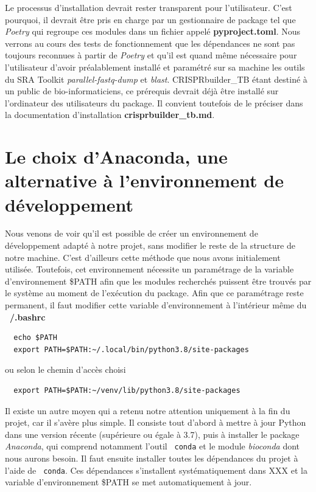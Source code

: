\documentclass[twoside,a4paper,11pt,frenchb,openany]{report}
\begin{document}
Le processus d'installation devrait rester transparent pour l'utilisateur. C'est pourquoi, il devrait être pris en charge par un gestionnaire de package tel que \textit{Poetry} qui regroupe ces modules dans un fichier appelé \textbf{pyproject.toml}. Nous verrons au cours des tests de fonctionnement que les dépendances ne sont pas toujours reconnues à partir de \textit{Poetry} et qu'il est quand même nécessaire pour l'utilisateur d'avoir préalablement installé et paramétré sur sa machine les outils du SRA Toolkit \textit{parallel-fastq-dump} et \textit{blast}. CRISPRbuilder\_TB étant destiné à un public de bio-informaticiens, ce prérequis devrait déjà être installé sur l'ordinateur des utilisateurs du package. Il convient toutefois de le préciser dans la documentation d'installation \textbf{crisprbuilder\_tb.md}.





\section{Le choix d'Anaconda, une alternative à l'environnement de développement}

Nous venons de voir qu'il est possible de créer un environnement de développement adapté à notre projet, sans modifier le reste de la structure de notre machine. C'est d'ailleurs cette méthode que nous avons initialement utilisée. Toutefois, cet environnement nécessite un paramétrage de la variable d'environnement \$PATH afin que les modules recherchés puissent être trouvés par le système au moment de l'exécution du package. Afin que ce paramétrage reste permanent, il faut modifier cette variable d'environnement à l'intérieur même du \textbf{~/.bashrc}

\begin{verbatim}
  echo $PATH
  export PATH=$PATH:~/.local/bin/python3.8/site-packages
\end{verbatim}

ou selon le chemin d'accès choisi

\begin{verbatim}
  export PATH=$PATH:~/venv/lib/python3.8/site-packages
\end{verbatim}

Il existe un autre moyen qui a retenu notre attention uniquement à la fin du projet, car il s'avère plus simple. Il consiste tout d'abord à mettre à jour Python dans une version récente (supérieure ou égale à 3.7), puis à installer le package \textit{Anaconda}, qui comprend notamment l'outil \texttt{  conda} et le module \textit{bioconda} dont nous aurons besoin. Il faut ensuite installer toutes les dépendances du projet à l'aide de \texttt{  conda}. Ces dépendances s'installent systématiquement dans XXX et la variable d'environnement \$PATH se met automatiquement à jour.
\end{document}
